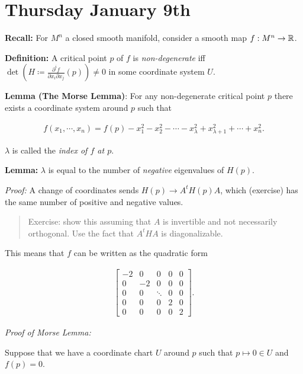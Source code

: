 
\hypertarget{thursday-january-9th}{%
\section{Thursday January 9th}\label{thursday-january-9th}}

\textbf{Recall:} For \(M^n\) a closed smooth manifold, consider a smooth
map \(f: M^n \to \mathbb{R}\).

\textbf{Definition:} A critical point \(p\) of \(f\) is
\emph{non-degenerate} iff
\(\det( H\coloneqq \frac{\partial^i f}{\partial x_i \partial x_j}(p)) \neq 0\) in
some coordinate system \(U\).

\textbf{Lemma (The Morse Lemma)}: For any non-degenerate critical point
\(p\) there exists a coordinate system around \(p\) such that

\begin{align*}
f(x_1, \cdots, x_n) = f(p) - x_1^2 - x_2^2 - \cdots - x_\lambda^2 + x_{\lambda+1}^2 + \cdots + x_n^2
.\end{align*}

\(\lambda\) is called the \emph{index of \(f\) at \(p\)}.

\textbf{Lemma:} \(\lambda\) is equal to the number of \emph{negative}
eigenvalues of \(H(p)\).

\emph{Proof:} A change of coordinates sends \(H(p) \to A^t H(p) A\),
which (exercise) has the same number of positive and negative values.

\begin{quote}
Exercise: show this assuming that \(A\) is invertible and not
necessarily orthogonal. Use the fact that \(A^t H A\) is diagonalizable.
\end{quote}

This means that \(f\) can be written as the quadratic form

\begin{align*}
\left[\begin{array}{ccccc}
-2  & 0  & 0       & 0    & 0 \\
0   & -2 & 0       & 0    & 0 \\
0   & 0  & \ddots  &  0   & 0 \\
0   & 0  & 0       &  2   & 0 \\
0   & 0  & 0       &  0   & 2
\end{array}\right]
.\end{align*}

\emph{Proof of Morse Lemma:}

Suppose that we have a coordinate chart \(U\) around \(p\) such that
\(p\mapsto 0\in U\) and \(f(p) = 0\).

